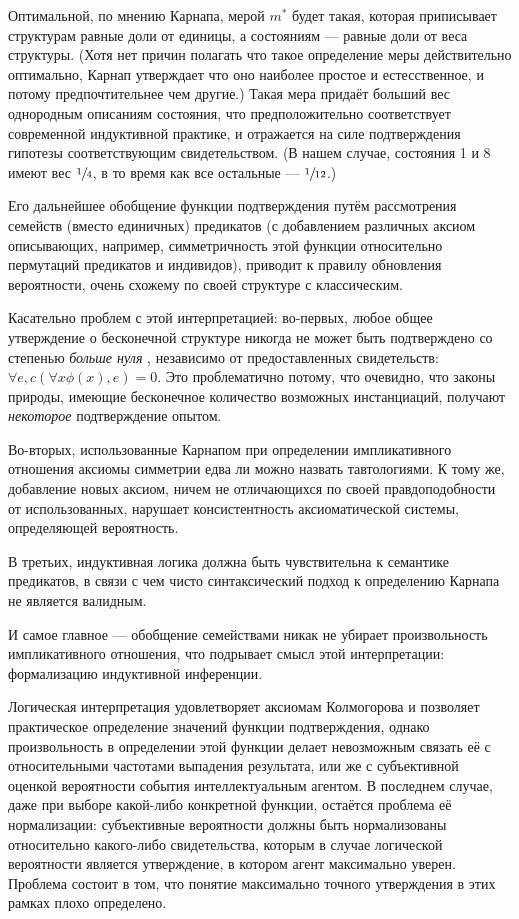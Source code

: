 \documentclass[14pt, a4paper, pdftex]{extarticle}
\begin{document}
Оптимальной, по мнению Карнапа, мерой $m^*$ будет такая, которая приписывает структурам равные доли от единицы, а состояниям --- равные доли от веса структуры. (Хотя нет причин полагать что такое определение меры действительно оптимально, Карнап утверждает что оно наиболее простое и естесственное, и потому предпочтительнее чем другие.) Такая мера придаёт больший вес однородным описаниям состояния, что предположительно соответствует современной индуктивной практике, и отражается на силе подтверждения гипотезы соответствующим свидетельством. (В нашем случае, состояния 1 и 8 имеют вес $\sfrac14$, в то время как все остальные --- $\sfrac{1}{12}$.)

Его дальнейшее обобщение функции подтверждения путём рассмотрения семейств (вместо единичных) предикатов (с добавлением различных аксиом описывающих, например, симметричность этой функции относительно пермутаций предикатов и индивидов), приводит к правилу обновления вероятности, очень схожему по своей структуре с классическим.

Касательно проблем с этой интерпретацией: во-первых, любое общее утверждение о бесконечной структуре никогда не может быть подтверждено со степенью \emph{больше нуля} , независимо от предоставленных свидетельств: $\forall e, c(\forall x\phi(x), e) = 0$. Это проблематично потому, что очевидно, что законы природы, имеющие бесконечное количество возможных инстанциаций, получают \emph{некоторое} подтверждение опытом. 

Во-вторых, использованные Карнапом при определении импликативного отношения аксиомы симметрии едва ли можно назвать тавтологиями. К тому же, добавление новых аксиом, ничем не отличающихся по своей правдоподобности от использованных, нарушает консистентность аксиоматической системы, определяющей вероятность.

В третьих, индуктивная логика должна быть чувствительна к семантике предикатов, в связи с чем чисто синтаксический подход к определению Карнапа не является валидным. 

И самое главное --- обобщение семействами никак не убирает произвольность импликативного отношения, что подрывает смысл этой интерпретации: формализацию индуктивной инференции.

Логическая интерпретация удовлетворяет аксиомам Колмогорова и позволяет практическое определение значений функции подтверждения, однако произвольность в определении этой функции делает невозможным связать её с относительными частотами выпадения результата, или же с субъективной оценкой вероятности события интеллектуальным агентом. В последнем случае, даже при выборе какой-либо конкретной функции, остаётся проблема её нормализации: субъективные вероятности должны быть нормализованы относительно какого-либо свидетельства, которым в случае логической вероятности является утверждение, в котором агент максимально уверен. Проблема состоит в том, что понятие максимально точного утверждения в этих рамках плохо определено.
\end{document}
